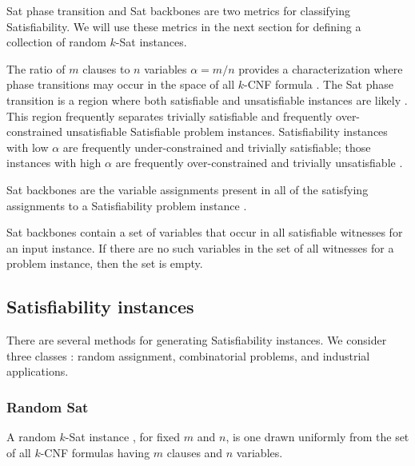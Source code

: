 {\sc Sat} phase transition and {\sc Sat} backbones are two metrics for classifying {\sc Satisfiability}.  We will use these metrics in the next section for defining a collection of random $k$-{\sc Sat} instances.
		


The ratio of $m$ clauses to $n$ variables $\alpha = m/n$ provides a characterization where phase transitions may occur in the space of all $k$-CNF formula \cite{Doherty08thehandbook,Gent94thesat}.  The {\sc Sat} phase transition is a region where both satisfiable and unsatisfiable instances are likely \cite{Gent94thesat}.  This region frequently separates trivially satisfiable and frequently over-constrained unsatisfiable {\sc Satisfiable} problem instances.  {\sc Satisfiability} instances with low $\alpha$ are frequently under-constrained and trivially satisfiable; those instances with high $\alpha$ are frequently over-constrained and trivially unsatisfiable \cite{Gent94thesat}.
		
\begin{definition}
{\sc Sat} backbones are the variable assignments present in all of the satisfying assignments to a {\sc Satisfiability} problem instance \cite{Zhang2001}. 

\end{definition}

{\sc Sat} backbones contain a set of variables that occur in all satisfiable witnesses for an input instance.  If there are no such variables in the set of all witnesses for a problem instance, then the set is empty.

	\subsection{{\sc Satisfiability} instances}
		
There are several methods for generating {\sc Satisfiability} instances.  We consider three classes \cite{satcompetition}: random assignment, combinatorial problems, and industrial applications.
	
\subsubsection{Random {\sc Sat}}
A random $k$-{\sc Sat} instance \cite{wilsonKsat}, for fixed $m$ and $n$, is one drawn uniformly from the set of all $k$-CNF formulas having $m$ clauses and $n$ variables.

